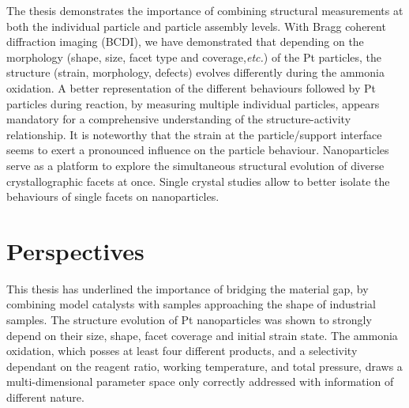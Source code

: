 
The thesis demonstrates the importance of combining structural measurements at both the individual particle and particle assembly levels.
With Bragg coherent diffraction imaging (BCDI), we have demonstrated that depending on the morphology (shape, size, facet type and coverage,\textit{etc.}) of the Pt particles, the structure (strain, morphology, defects) evolves differently during the ammonia oxidation.
A better representation of the different behaviours followed by Pt particles during reaction, by measuring multiple individual particles, appears mandatory for a comprehensive understanding of the structure-activity relationship.
It is noteworthy that the strain at the particle/support interface seems to exert a pronounced influence on the particle behaviour.
Nanoparticles serve as a platform to explore the simultaneous structural evolution of diverse crystallographic facets at once.
Single crystal studies allow to better isolate the behaviours of single facets on nanoparticles.

\section{Perspectives}


This thesis has underlined the importance of bridging the material gap, by combining model catalysts with samples approaching the shape of industrial samples.
The structure evolution of Pt nanoparticles was shown to strongly depend on their size, shape, facet coverage and initial strain state.
The ammonia oxidation, which posses at least four different products, and a selectivity dependant on the reagent ratio, working temperature, and total pressure, draws a multi-dimensional parameter space only correctly addressed with information of different nature.

